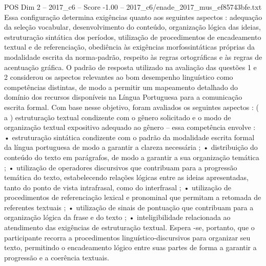 \begin{textsample}{POS Dim 2 – 2017\_c6 – Score -1.00 – 2017\_c6/enade\_2017\_mus\_ef85743bfe.txt}
Essa configuração determina exigências quanto aos seguintes aspectos : adequação da seleção vocabular, desenvolvimento do conteúdo, organização lógica das ideias, estruturação sintática dos períodos, utilização de procedimentos de encadeamento textual e de referenciação, obediência às exigências morfossintáticas próprias da modalidade escrita da norma-padrão, respeito às regras ortográficas e às regras de acentuação gráfica.
O padrão de resposta utilizado na avaliação das questões 1 e 2 considerou os aspectos relevantes ao bom desempenho linguístico como competências distintas, de modo a permitir um mapeamento detalhado do domínio dos recursos disponíveis na Língua Portuguesa para a comunicação escrita formal.
Com base nesse objetivo, foram avaliados os seguintes aspectos : ( a ) estruturação textual condizente com o gênero solicitado e o modo de organização textual expositivo adequado ao gênero – essa competência envolve : • estruturação sintática condizente com o padrão da modalidade escrita formal da língua portuguesa de modo a garantir a clareza necessária ; • distribuição do conteúdo do texto em parágrafos, de modo a garantir a sua organização temática ; • utilização de operadores discursivos que contribuam para a progressão temática do texto, estabelecendo relações lógicas entre as ideias apresentadas, tanto do ponto de vista intrafrasal, como do interfrasal ; • utilização de procedimentos de referenciação lexical e pronominal que permitam a retomada de referentes textuais ; • utilização de sinais de pontuação que contribuam para a organização lógica da frase e do texto ; • inteligibilidade relacionada ao atendimento das exigências de estruturação textual.
Espera -se, portanto, que o participante recorra a procedimentos linguístico-discursivos para organizar seu texto, permitindo o encadeamento lógico entre suas partes de forma a garantir a progressão e a coerência textuais.

\end{textsample}
